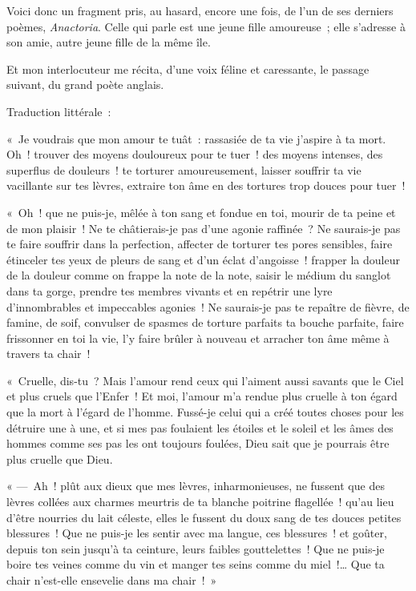 \documentclass[french,twoside]{book} %
\begin{document}
Voici donc un fragment pris, au hasard, encore une fois, de l’un de ses derniers poèmes, \emph{Anactoria}. Celle qui parle est une jeune fille amoureuse ; elle s’adresse à son amie, autre jeune fille de la même île.\par
Et mon interlocuteur me récita, d’une voix féline et caressante, le passage suivant, du grand poète anglais.\par
Traduction littérale :\par
« Je voudrais que mon amour te tuât :   rassasiée de ta vie j’aspire à ta mort. Oh ! trouver des moyens douloureux pour te tuer ! des moyens intenses, des superflus de douleurs ! te torturer amoureusement, laisser souffrir ta vie vacillante sur tes lèvres, extraire ton âme en des tortures trop douces pour tuer !\par
« Oh ! que ne puis-je, mêlée à ton sang et fondue en toi, mourir de ta peine et de mon plaisir ! Ne te châtierais-je pas d’une agonie raffinée ? Ne saurais-je pas te faire souffrir dans la perfection, affecter de torturer tes pores sensibles, faire étinceler tes yeux de pleurs de sang et d’un éclat d’angoisse ! frapper la douleur de la douleur comme on frappe la note de la note, saisir le médium du sanglot dans ta gorge, prendre tes membres vivants et en repétrir une lyre d’innombrables et impeccables agonies ! Ne saurais-je pas te repaître de fièvre, de famine, de soif, convulser de spasmes de torture parfaits ta bouche parfaite, faire frissonner en toi la vie, l’y faire brûler à nouveau et arracher ton âme même à travers ta chair !\par
« Cruelle, dis-tu ? Mais l’amour rend ceux   qui l’aiment aussi savants que le Ciel et plus cruels que l’Enfer ! Et moi, l’amour m’a rendue plus cruelle à ton égard que la mort à l’égard de l’homme. Fussé-je celui qui a créé toutes choses pour les détruire une à une, et si mes pas foulaient les étoiles et le soleil et les âmes des hommes comme ses pas les ont toujours foulées, Dieu sait que je pourrais être plus cruelle que Dieu.\par
« — Ah ! plût aux dieux que mes lèvres, inharmonieuses, ne fussent que des lèvres collées aux charmes meurtris de ta blanche poitrine flagellée ! qu’au lieu d’être nourries du lait céleste, elles le fussent du doux sang de tes douces petites blessures ! Que ne puis-je les sentir avec ma langue, ces blessures ! et goûter, depuis ton sein jusqu’à ta ceinture, leurs faibles gouttelettes ! Que ne puis-je boire tes veines comme du vin et manger tes seins comme du miel !… Que ta chair n’est-elle ensevelie dans ma chair ! »\par
\end{document}
